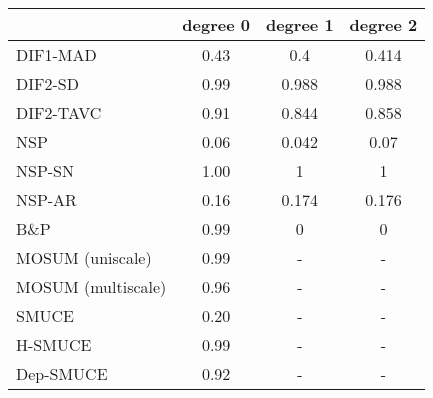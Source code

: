 \begin{tabular}{|l|c|c|c|}
  \hline
 & degree 0 & degree 1 & degree 2 \\ 
  \hline
DIF1-MAD & 0.43 & 0.4 & 0.414 \\ 
  DIF2-SD & 0.99 & 0.988 & 0.988 \\ 
  DIF2-TAVC & 0.91 & 0.844 & 0.858 \\ 
  NSP & 0.06 & 0.042 & 0.07 \\ 
  NSP-SN & 1.00 & 1 & 1 \\ 
  NSP-AR & 0.16 & 0.174 & 0.176 \\ 
  B\&P & 0.99 & 0 & 0 \\ 
  MOSUM (uniscale) & 0.99 & - & - \\ 
  MOSUM (multiscale) & 0.96 & - & - \\ 
  SMUCE & 0.20 & - & - \\ 
  H-SMUCE & 0.99 & - & - \\ 
  Dep-SMUCE & 0.92 & - & - \\ 
   \hline
\end{tabular}
